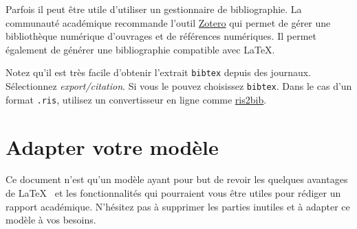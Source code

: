     Parfois il peut être utile d'utiliser un gestionnaire de bibliographie. La communauté académique recommande l'outil \href{https://www.zotero.org/}{Zotero} qui permet de gérer une bibliothèque numérique d'ouvrages et de références numériques. Il permet également de générer une bibliographie compatible avec \LaTeX.
    
    Notez qu'il est très facile d'obtenir l'extrait \texttt{bibtex} depuis des journaux. Sélectionnez \emph{export/citation}. Si vous le pouvez choisissez \texttt{bibtex}. Dans le cas d'un format \texttt{.ris}, utilisez un convertisseur en ligne comme \href{http://www.bruot.org/ris2bib/}{ris2bib}.
    
    \section{Adapter votre modèle}
    Ce document n'est qu'un modèle ayant pour but de revoir les quelques avantages de \LaTeX~ et les fonctionnalités qui pourraient vous être utiles pour rédiger un rapport académique. N'hésitez pas à supprimer les parties inutiles et à adapter ce modèle à vos besoins.
\fi